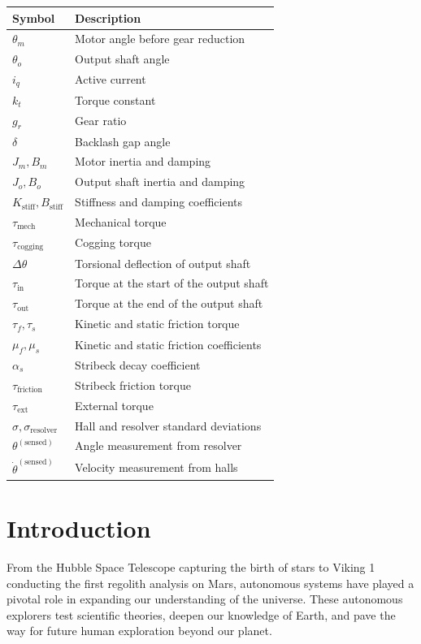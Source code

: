 \documentclass[twocolumn,letterpaper]{IEEEAerospaceCLS}  %
\begin{document}
\begin{table}[h!]
\renewcommand{\arraystretch}{1.1}
\centering
\begin{tabular}{l l}
\hline
\textbf{Symbol} & \textbf{Description} \\
\hline
$ \theta_m $ & Motor angle before gear reduction \\
$ \theta_o $ & Output shaft angle \\
$ i_q $ & Active current \\
$ k_t $ & Torque constant \\
$ g_r $ & Gear ratio \\
$ \delta $ & Backlash gap angle \\
$ J_m, B_m $ & Motor inertia and damping \\
$ J_o, B_o $ & Output shaft inertia and damping \\
$ K_{\text{stiff}}, B_{\text{stiff}} $ & Stiffness and damping coefficients \\
$ \tau_{\text{mech}} $ & Mechanical torque \\
$ \tau_{\text{cogging}} $ & Cogging torque \\
$ \Delta \theta $ & Torsional deflection of output shaft \\
$ \tau_{\text{in}} $ & Torque at the start of the output shaft \\
$ \tau_{\text{out}} $ & Torque at the end of the output shaft \\
$ \tau_f, \tau_s $ & Kinetic and static friction torque \\
$ \mu_f, \mu_s  $ & Kinetic and static friction coefficients \\
$ \alpha_s $ & Stribeck decay coefficient \\
$ \tau_{\text{friction}} $ & Stribeck friction torque \\
$ \tau_{\text{ext}} $ & External torque \\
$ \sigma, \sigma_{\text{resolver}} $ & Hall and resolver standard deviations \\
$ \theta^{(\text{sensed})} $ & Angle measurement from resolver \\
$ \dot{\theta}^{(\text{sensed})} $ & Velocity measurement from halls \\
\hline
\end{tabular}
\end{table}




\tableofcontents

\section{Introduction} 
From the Hubble Space Telescope capturing the birth of stars to Viking 1 conducting the first regolith analysis on Mars, autonomous systems have played a pivotal role in expanding our understanding of the universe. These autonomous explorers test scientific theories, deepen our knowledge of Earth, and pave the way for future human exploration beyond our planet.
\end{document}
